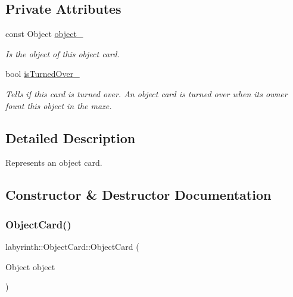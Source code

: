 \subsection*{Private Attributes}
\begin{DoxyCompactItemize}
\item 
\mbox{\label{structlabyrinth_1_1_object_card_ad258fa4135e2c9def6f9507afd6ac49c}} 
const Object \mbox{\hyperlink{structlabyrinth_1_1_object_card_ad258fa4135e2c9def6f9507afd6ac49c}{object\+\_\+}}
\begin{DoxyCompactList}\small\item\em Is the object of this object card. \end{DoxyCompactList}\item 
\mbox{\label{structlabyrinth_1_1_object_card_a6569018ae249c927b4081d08df73065f}} 
bool \mbox{\hyperlink{structlabyrinth_1_1_object_card_a6569018ae249c927b4081d08df73065f}{is\+Turned\+Over\+\_\+}}
\begin{DoxyCompactList}\small\item\em Tells if this card is turned over. An object card is turned over when its owner fount this object in the maze. \end{DoxyCompactList}\end{DoxyCompactItemize}


\subsection{Detailed Description}
Represents an object card. 

\subsection{Constructor \& Destructor Documentation}
\mbox{\label{structlabyrinth_1_1_object_card_a02eb46ffcf12f68b81e288aa9366f9ec}} 
\subsubsection{\texorpdfstring{ObjectCard()}{ObjectCard()}}
{\footnotesize\ttfamily labyrinth\+::\+Object\+Card\+::\+Object\+Card (\begin{DoxyParamCaption}\item[{Object}]{object }\end{DoxyParamCaption})\hspace{0.3cm}{\ttfamily [inline]}}



